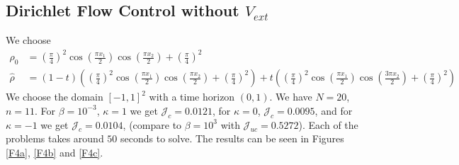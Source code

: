 \documentclass[11pt, a4paper]{article}
\theoremstyle{definition}
\newcommand{\hr}{\widehat \rho}
\begin{document}
	\subsection{Dirichlet Flow Control without $V_{ext}$}
	We choose 
	\begin{align*}
		\rho_0 &= \left(\frac{\pi}{4}\right)^2\cos\left(\frac{\pi x_1}{2}\right)\cos\left(\frac{\pi x_2}{2}\right) + \left(\frac{\pi}{4}\right)^2\\
		\hr &= (1 - t)\left(\left(\frac{\pi}{4}\right)^2\cos\left(\frac{\pi x_1}{2}\right)\cos\left(\frac{\pi x_2}{2}\right) + \left(\frac{\pi}{4}\right)^2\right) + t\left(\left(\frac{\pi}{4}\right)^2\cos\left(\frac{\pi x_1}{2}\right)\cos\left(\frac{3\pi x_2}{2}\right) + \left(\frac{\pi}{4}\right)^2\right)
	\end{align*}
	We choose the domain $[-1,1]^2$ with a time horizon $(0,1)$. We have $N = 20$, $n = 11$. 
	For $\beta = 10^{-3}$, $\kappa = 1$ we get $\mathcal J_c = 0.0121$, for $\kappa = 0$, $\mathcal J_c = 0.0095$, and for $\kappa = - 1$ we get $\mathcal J_c = 0.0104$, (compare to $\beta = 10^3$ with $\mathcal J_{uc} = 0.5272$). Each of the problems takes around $50$ seconds to solve. The results can be seen in Figures \ref{F4a}, \ref{F4b} and \ref{F4c}.
\end{document}
